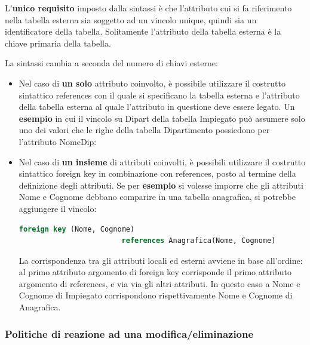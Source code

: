 \documentclass[a4paper]{article}
\begin{document}
	L'\textbf{unico requisito} imposto dalla sintassi è che l'attributo cui si fa riferimento nella tabella esterna sia soggetto ad un vincolo \textsf{unique}, quindi sia un identificatore della tabella. Solitamente l'attributo della tabella esterna è la chiave primaria della tabella.\newline
	
	\noindent
	La sintassi cambia a seconda del numero di chiavi esterne:
	\begin{itemize}
		\item Nel caso di \textbf{un solo} attributo coinvolto, è possibile utilizzare il costrutto sintattico \textsf{references} con il quale si specificano la tabella esterna e l'attributo della tabella esterna al quale l'attributo in questione deve essere legato.\newline
		Un \textcolor{Green4}{\textbf{esempio}} in cui il vincolo su \textsf{Dipart} della tabella Impiegato può assumere solo uno dei valori che le righe della tabella Dipartimento possiedono per l'attributo \textsf{NomeDip}:
		
		
		\item Nel caso di \textbf{un insieme} di attributi coinvolti, è possibili utilizzare il costrutto sintattico \textsf{foreign key} in combinazione con \textsf{references}, posto al termine della definizione degli attributi.\newline
		Se per \textcolor{Green4}{\textbf{esempio}} si volesse imporre che gli attributi \textsf{Nome} e \textsf{Cognome} debbano comparire in una tabella anagrafica, si potrebbe aggiungere il vincolo:
\begin{lstlisting}[language=SQL]
foreign key (Nome, Cognome)
						references Anagrafica(Nome, Cognome)\end{lstlisting}
		La corrispondenza tra gli attributi locali ed esterni avviene in base all'ordine: al primo attributo argomento di \textsf{foreign key} corrisponde il primo attributo argomento di \textsf{references}, e via via gli altri attributi. In questo caso a \textsf{Nome} e \textsf{Cognome} di Impiegato corrispondono rispettivamente \textsf{Nome} e \textsf{Cognome} di Anagrafica.
	\end{itemize}\newpage
	
	\subsubsection{Politiche di reazione ad una modifica/eliminazione}\label{par: politiche di reazione ad una modifica/eliminazione}
	
\end{document}
